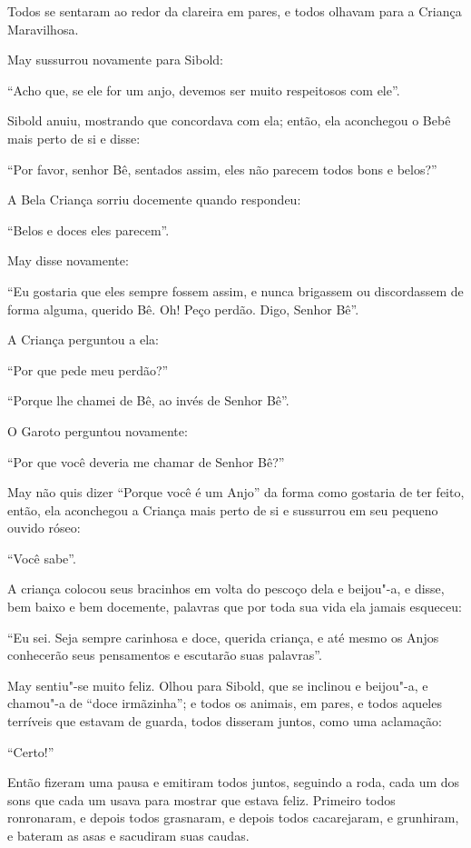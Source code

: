 Todos se sentaram ao redor da clareira em pares, e todos olhavam para a
Criança Maravilhosa.

May sussurrou novamente para Sibold:

``Acho que, se ele for um anjo, devemos ser muito respeitosos com ele''.

Sibold anuiu, mostrando que concordava com ela; então, ela aconchegou o
Bebê mais perto de si e disse:

``Por favor, senhor Bê, sentados assim, eles não parecem todos bons e
belos?''

A Bela Criança sorriu docemente quando respondeu:

``Belos e doces eles parecem''.

May disse novamente:

``Eu gostaria que eles sempre fossem assim, e nunca brigassem ou
discordassem de forma alguma, querido Bê. Oh! Peço perdão. Digo, Senhor
Bê''.

A Criança perguntou a ela:

``Por que pede meu perdão?''

``Porque lhe chamei de Bê, ao invés de Senhor Bê''.

O Garoto perguntou novamente:

``Por que você deveria me chamar de Senhor Bê?''

May não quis dizer ``Porque você é um Anjo'' da forma como gostaria de
ter feito, então, ela aconchegou a Criança mais perto de si e sussurrou
em seu pequeno ouvido róseo:

``Você sabe''.

A criança colocou seus bracinhos em volta do pescoço dela e beijou"-a, e
disse, bem baixo e bem docemente, palavras que por toda sua vida ela
jamais esqueceu:

``Eu sei. Seja sempre carinhosa e doce, querida criança, e até mesmo os
Anjos conhecerão seus pensamentos e escutarão suas palavras''.

May sentiu"-se muito feliz. Olhou para Sibold, que se inclinou e
beijou"-a, e chamou"-a de ``doce irmãzinha''; e todos os animais, em
pares, e todos aqueles terríveis que estavam de guarda, todos disseram
juntos, como uma aclamação:

``Certo!''

Então fizeram uma pausa e emitiram todos juntos, seguindo a roda, cada
um dos sons que cada um usava para mostrar que estava feliz. Primeiro
todos ronronaram, e depois todos grasnaram, e depois todos cacarejaram,
e grunhiram, e bateram as asas e sacudiram suas caudas.

